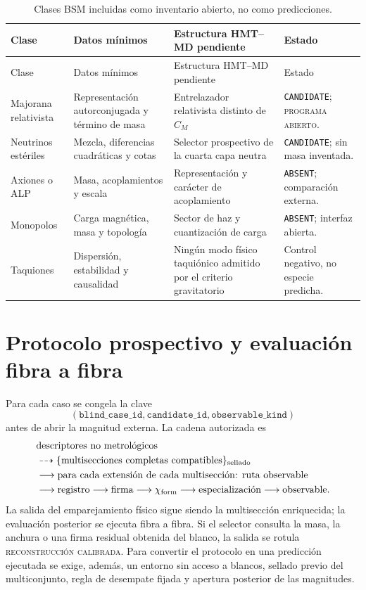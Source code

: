 \begin{longtable}{@{}L{0.20\textwidth}L{0.24\textwidth}L{0.25\textwidth}L{0.22\textwidth}@{}}
\caption{Clases BSM incluidas como inventario abierto, no como predicciones.}
\label{tab:catalogo-bsm}\\
\toprule
Clase & Datos mínimos & Estructura HMT--MD pendiente & Estado\\
\midrule
\endfirsthead
\toprule
Clase & Datos mínimos & Estructura HMT--MD pendiente & Estado\\
\midrule
\endhead
Majorana relativista&
Representación autorconjugada y término de masa&
Entrelazador relativista distinto de \(C_M\)&
\texttt{CANDIDATE}; \textsc{programa abierto}.\\
Neutrinos estériles&
Mezcla, diferencias cuadráticas y cotas&
Selector prospectivo de la cuarta capa neutra&
\texttt{CANDIDATE}; sin masa inventada.\\
Axiones o ALP&
Masa, acoplamientos y escala&
Representación y carácter de acoplamiento&
\texttt{ABSENT}; comparación externa.\\
Monopolos&
Carga magnética, masa y topología&
Sector de haz y cuantización de carga&
\texttt{ABSENT}; interfaz abierta.\\
Taquiones&
Dispersión, estabilidad y causalidad&
Ningún modo físico taquiónico admitido por el criterio gravitatorio&
Control negativo, no especie predicha.\\
\bottomrule
\end{longtable}

\section{Protocolo prospectivo y evaluación fibra a fibra}

Para cada caso se congela la clave
\[
 (\texttt{blind\_case\_id},\texttt{candidate\_id},
   \texttt{observable\_kind})
\]
antes de abrir la magnitud externa. La cadena autorizada es
\[
\begin{aligned}
&\text{descriptores no metrológicos}\\
&\dashrightarrow
\{\text{multisecciones completas compatibles}\}_{\rm sellado}\\
&\longrightarrow
\text{para cada extensión de cada multisección: ruta observable}\\
&\longrightarrow\text{registro}
\longrightarrow\text{firma}
\longrightarrow\chi_{\rm form}
\longrightarrow\text{especialización}
\longrightarrow\text{observable}.
\end{aligned}
\]
La salida del emparejamiento físico sigue siendo la multisección enriquecida;
la evaluación posterior se ejecuta fibra a fibra. Si el selector consulta la
masa, la anchura o una firma residual obtenida del blanco, la salida se
rotula \textsc{reconstrucción calibrada}. Para convertir el protocolo en una
predicción ejecutada se exige, además, un entorno sin acceso a blancos,
sellado previo del multiconjunto, regla de desempate fijada y apertura
posterior de las magnitudes.

